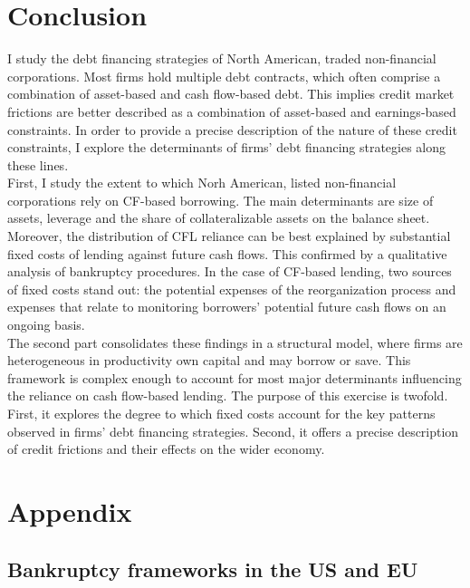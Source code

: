 \documentclass[12pt]{article}
\begin{document}
\section{Conclusion \label{Concl}}
I study the debt financing strategies of North American, traded non-financial corporations. Most firms hold multiple debt contracts, which often comprise a combination of asset-based and cash flow-based debt.  This implies credit market frictions are better described as a combination of asset-based and earnings-based constraints. In order to provide a precise description of the nature of these credit constraints, I explore the determinants of firms’ debt financing strategies along these lines. \vspace{3mm} \\
First, I study the extent to which Norh American, listed non-financial corporations rely on CF-based borrowing. The main determinants are size of assets, leverage and the share of collateralizable assets on the balance sheet. Moreover, the distribution of CFL reliance can be best explained by substantial fixed costs of lending against future cash flows. This confirmed by a qualitative analysis of bankruptcy procedures. In the case of CF-based lending, two sources of fixed costs stand out: the potential expenses of the reorganization process and expenses that relate to monitoring borrowers’ potential future cash flows on an ongoing basis. \vspace{3mm} \\
The second part consolidates these findings in a structural model, where firms are heterogeneous in productivity own capital and may borrow or save. This framework is complex enough to account for most major determinants influencing the reliance on cash flow-based lending. The purpose of this exercise is twofold. First, it explores the degree to which fixed costs account for the key patterns observed in firms' debt financing strategies. Second, it offers a precise description of credit frictions and their effects on the wider economy.



\setcounter{table}{0}
\setcounter{figure}{0}
\setcounter{section}{0}


\section{Appendix \label{sec:appendix}}
\subsection{Bankruptcy frameworks in the US and EU  \label{sec:A1}}
\end{document}
